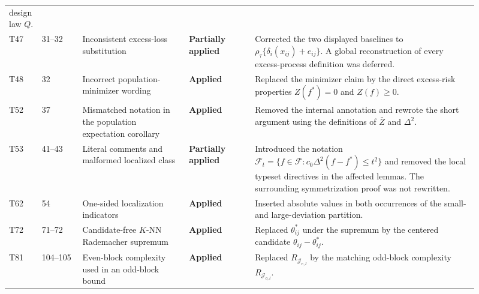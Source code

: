 \documentclass[10pt]{article}
\newcommand{\applied}{\textcolor{appliedgreen}{\textbf{Applied}}}
\newcommand{\partialapplied}{\textcolor{partialorange}{\textbf{Partially applied}}}
\begin{document}
\begin{landscape}
\begin{longtable}{L{0.045\linewidth}L{0.08\linewidth}L{0.21\linewidth}L{0.13\linewidth}L{0.445\linewidth}}
design law $Q$.\\
T47 & 31--32 & Inconsistent excess-loss substitution & \partialapplied & Corrected the
two displayed baselines to $\rho_\tau\{\delta_i(x_{ij})+e_{ij}\}$. A global
reconstruction of every excess-process definition was deferred.\\
T48 & 32 & Incorrect population-minimizer wording & \applied &
Replaced the minimizer claim by the direct excess-risk properties
$Z(f^*)=0$ and $Z(f)\geq0$.\\
T52 & 37 & Mismatched notation in the population expectation corollary & \applied &
Removed the internal annotation and rewrote the short argument using the
definitions of $\bar Z$ and $\Delta^2$.\\
T53 & 41--43 & Literal comments and malformed localized class &
\partialapplied & Introduced the notation
$\mathcal F_t=\{f\in\mathcal F:c_0\Delta^2(f-f^*)\leq t^2\}$ and removed the
local typeset directives in the affected lemmas. The surrounding
symmetrization proof was not rewritten.\\
T62 & 54 & One-sided localization indicators & \applied & Inserted absolute values
in both occurrences of the small- and large-deviation partition.\\
T72 & 71--72 & Candidate-free $K$-NN Rademacher supremum & \applied &
Replaced $\theta^*_{ij}$ under the supremum by the centered candidate
$\theta_{ij}-\theta^*_{ij}$.\\
T81 & 104--105 & Even-block complexity used in an odd-block bound & \applied & Replaced
$R_{\mathcal J_{e,l}}$ by the matching odd-block complexity
$R_{\mathcal J_{o,l}}$.\\


\end{longtable}
\end{landscape}
\end{document}
